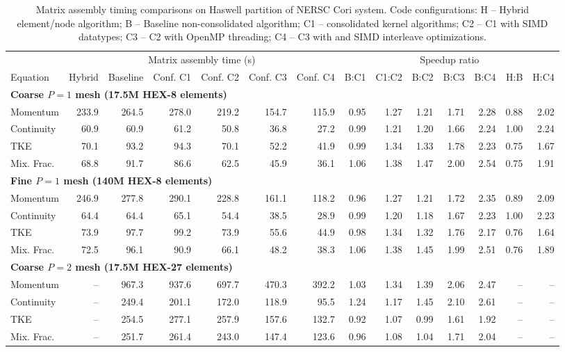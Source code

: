 \begin{landscape}
  \begin{table}[tb]
    \centering
    \caption{Matrix assembly timing comparisons on Haswell partition of NERSC Cori
      system. Code configurations: H -- Hybrid element/node algorithm; B --
      Baseline non-consolidated algorithm; C1 -- consolidated kernel algorithms; C2 --
      C1 with SIMD datatypes; C3 -- C2 with OpenMP threading; C4 -- C3 with
       and SIMD interleave optimizations.}
    \label{tab:haswell_assembly_timings}
    \begin{tabular}{l|r|r|r|r|r|r|r|r|r|r|r|r|r}
      \hline\hline
      & \multicolumn{6}{c|}{Matrix assembly time (s)} & \multicolumn{7}{c}{Speedup ratio} \\[0.5em]
      Equation & Hybrid & Baseline & Conf. C1 & Conf. C2 & Conf. C3 & Conf. C4 & B:C1 & C1:C2 & B:C2 & B:C3 & B:C4  & H:B & H:C4\\ [1em]
      \multicolumn{10}{l}{\textbf{Coarse $P=1$ mesh (17.5M HEX-8 elements)}} \\
      \hline
      Momentum & 233.9 & 264.5 & 278.0 & 219.2 & 154.7 & 115.9 & 0.95 & 1.27 & 1.21 & 1.71 & 2.28 & 0.88 & 2.02\\
      Continuity & 60.9 & 60.9 & 61.2 & 50.8 & 36.8 & 27.2 & 0.99 & 1.21 & 1.20 & 1.66 & 2.24 & 1.00 & 2.24\\
      TKE & 70.1 & 93.2 & 94.3 & 70.1 & 52.2 & 41.9 & 0.99 & 1.34 & 1.33 & 1.78 & 2.23 & 0.75 & 1.67\\
      Mix. Frac. & 68.8 & 91.7 & 86.6 & 62.5 & 45.9 & 36.1 & 1.06 & 1.38 & 1.47 & 2.00 & 2.54 & 0.75 & 1.91\\ [1em]
      \multicolumn{10}{l}{\textbf{Fine $P=1$ mesh (140M HEX-8 elements)}} \\
      \hline
      Momentum & 246.9 & 277.8 & 290.1 & 228.8 & 161.1 & 118.2 & 0.96 & 1.27 & 1.21 & 1.72 & 2.35 & 0.89 & 2.09\\
      Continuity & 64.4 & 64.4 & 65.1 & 54.4 & 38.5 & 28.9 & 0.99 & 1.20 & 1.18 & 1.67 & 2.23 & 1.00 & 2.23\\
      TKE & 73.9 & 97.7 & 99.2 & 73.9 & 55.6 & 44.9 & 0.98 & 1.34 & 1.32 & 1.76 & 2.17 & 0.76 & 1.64\\
      Mix. Frac. & 72.5 & 96.1 & 90.9 & 66.1 & 48.2 & 38.3 & 1.06 & 1.38 & 1.45 & 1.99 & 2.51 & 0.76 & 1.89\\ [1em]
      \multicolumn{10}{l}{\textbf{Coarse $P=2$ mesh (17.5M HEX-27 elements)}} \\
      \hline
      Momentum & -- & 967.3 & 937.6 & 697.7 & 470.3 & 392.2 & 1.03 & 1.34 & 1.39 & 2.06 & 2.47 & -- & --\\
      Continuity & -- & 249.4 & 201.1 & 172.0 & 118.9 & 95.5 & 1.24 & 1.17 & 1.45 & 2.10 & 2.61 & -- & --\\
      TKE & -- & 254.5 & 277.1 & 257.9 & 157.6 & 132.7 & 0.92 & 1.07 & 0.99 & 1.61 & 1.92 & -- & --\\
      Mix. Frac. & -- & 251.7 & 261.4 & 243.0 & 147.4 & 123.6 & 0.96 & 1.08 & 1.04 & 1.71 & 2.04 & -- & --\\
      \hline\hline
    \end{tabular}
  \end{table}
\end{landscape}

